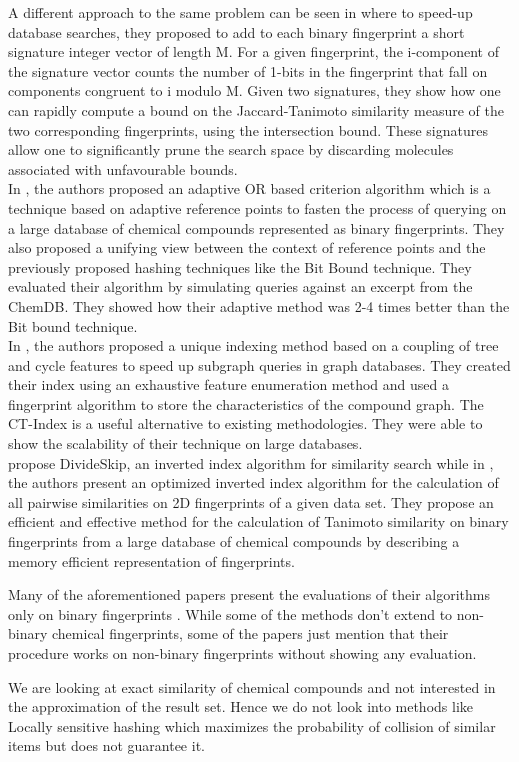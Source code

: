 A different approach to the same problem can be seen in \citet*{nasr2010hashing} where to speed-up database searches, they proposed to add to each binary fingerprint a short signature integer vector of length M. For a given fingerprint, the i-component of the signature vector counts the number of 1-bits in the fingerprint that fall on components congruent to i modulo M. Given two signatures, they show how one can rapidly compute a bound on the Jaccard-Tanimoto similarity measure of the two corresponding fingerprints, using the intersection bound. These signatures allow one to significantly prune the search space by discarding molecules associated with unfavourable bounds. \\

In \citet*{napolitano2014adaptive}, the authors proposed an adaptive OR based criterion algorithm which is a technique based on adaptive reference points to fasten the process of querying on a large database of chemical compounds represented as binary fingerprints. They also proposed a unifying view between the
context of reference points and the previously proposed hashing techniques like the Bit Bound technique. They evaluated their algorithm by simulating queries against an excerpt from the ChemDB. They showed how their adaptive method was 2-4 times better than the Bit bound technique.  \\

In \citet*{klein2011ct}, the authors proposed a unique indexing method based on a coupling of tree and cycle features to speed up subgraph queries in graph databases. They created their index using an exhaustive feature enumeration method and used a fingerprint algorithm to store the characteristics of the compound graph. The CT-Index is a useful alternative to existing methodologies. They were able to show the scalability of their technique on large databases. \\

\citet*{nasr2012speeding} propose DivideSkip, an inverted index algorithm for similarity search while in \citet*{thiel2014blocked}, the authors present an optimized inverted index algorithm for the calculation of all pairwise similarities on 2D fingerprints of a given data set. They propose an efficient and effective method for the calculation of Tanimoto similarity on binary fingerprints from a large database of chemical compounds by describing a memory efficient representation of fingerprints.

Many of the aforementioned papers present the evaluations of their algorithms only on binary fingerprints . While some of the methods don't extend to non-binary chemical fingerprints, some of the papers just mention that their procedure works on non-binary fingerprints without showing any evaluation. 

We are looking at exact similarity of chemical compounds and not interested in the approximation of the result set. Hence we do not look into methods like Locally sensitive hashing which maximizes the probability of collision of similar items but does not guarantee it. 
